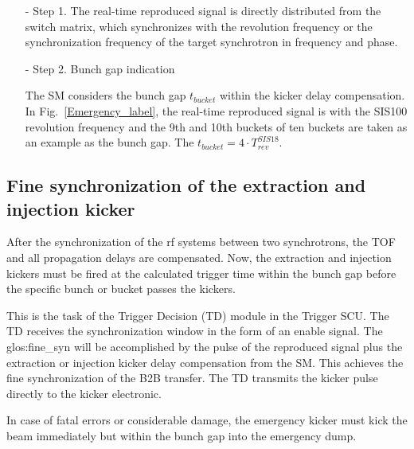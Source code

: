 \begin{itemize}
\begin{itemize}
\item[-] Step 1. The real-time reproduced signal is directly distributed from the switch matrix, which synchronizes with the revolution frequency or the synchronization frequency of the target synchrotron in frequency and phase.
\item[-] Step 2. Bunch gap indication

The SM considers the bunch gap $t_{\mathit{bucket}}$ within the kicker delay compensation. In Fig.~\ref{Emergency_label}, the real-time reproduced signal is with the SIS100 revolution frequency and the 9th and 10th buckets of ten buckets are taken as an example as the bunch gap. The $t_{\mathit{bucket}}=4\cdot T_{\mathit{rev}}^{\mathit{SIS18}}$.

\end{itemize}

\end{itemize}

\subsection{Fine synchronization of the extraction and injection kicker}
After the synchronization of the rf systems between two synchrotrons, the TOF and all propagation delays are compensated. Now, the extraction and injection kickers must be fired at the calculated trigger time within the bunch gap before the specific bunch or bucket passes the kickers.
 
This is the task of the Trigger Decision (TD) module in the Trigger SCU. The TD receives the  synchronization window in the form of an enable signal. The \gls{glos:fine_syn} will be accomplished by the pulse of the reproduced signal plus the extraction or injection kicker delay compensation from the SM. This achieves the fine synchronization of the B2B transfer. The TD transmits the kicker pulse directly to the kicker electronic.  
 
In case of fatal errors or considerable damage, the emergency kicker must kick the beam immediately but within the bunch gap into the emergency dump.



